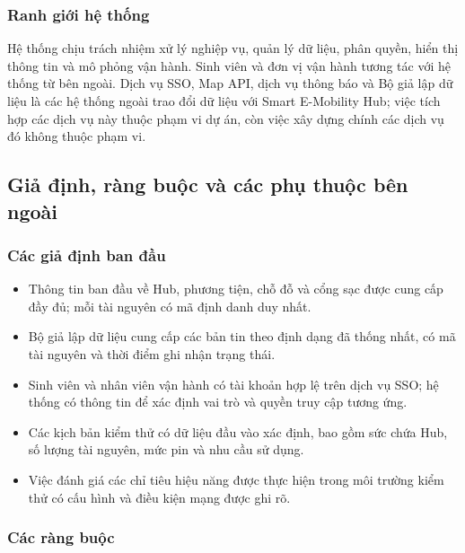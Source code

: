 \subsubsection{Ranh giới hệ thống}

Hệ thống chịu trách nhiệm xử lý nghiệp vụ, quản lý dữ liệu, phân quyền, hiển thị thông tin và mô phỏng vận hành. Sinh viên và đơn vị vận hành tương tác với hệ thống từ bên ngoài. Dịch vụ SSO, Map API, dịch vụ thông báo và Bộ giả lập dữ liệu là các hệ thống ngoài trao đổi dữ liệu với Smart E-Mobility Hub; việc tích hợp các dịch vụ này thuộc phạm vi dự án, còn việc xây dựng chính các dịch vụ đó không thuộc phạm vi.

\subsection{Giả định, ràng buộc và các phụ thuộc bên ngoài}

\subsubsection{Các giả định ban đầu}

\begin{itemize}

\item Thông tin ban đầu về Hub, phương tiện, chỗ đỗ và cổng sạc được cung cấp đầy đủ; mỗi tài nguyên có mã định danh duy nhất.

\item Bộ giả lập dữ liệu cung cấp các bản tin theo định dạng đã thống nhất, có mã tài nguyên và thời điểm ghi nhận trạng thái.

\item Sinh viên và nhân viên vận hành có tài khoản hợp lệ trên dịch vụ SSO; hệ thống có thông tin để xác định vai trò và quyền truy cập tương ứng.

\item Các kịch bản kiểm thử có dữ liệu đầu vào xác định, bao gồm sức chứa Hub, số lượng tài nguyên, mức pin và nhu cầu sử dụng.

\item Việc đánh giá các chỉ tiêu hiệu năng được thực hiện trong môi trường kiểm thử có cấu hình và điều kiện mạng được ghi rõ.

\end{itemize}

\subsubsection{Các ràng buộc}

